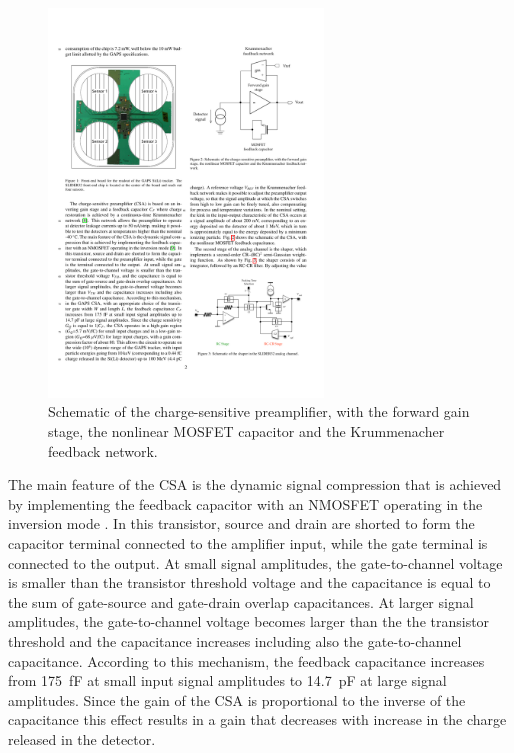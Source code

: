 \begin{figure}[h!]
    \centering
    \includegraphics[width=0.65\textwidth]{Images/chap1/CSA_schematic.pdf}
    \caption{Schematic of the charge-sensitive preamplifier, with the forward gain stage, the nonlinear MOSFET capacitor and the Krummenacher feedback network.}
    \label{figCSAschematic}
\end{figure}

\par
The main feature of the CSA is the dynamic signal compression that is achieved by implementing the feedback capacitor with an NMOSFET operating in the inversion mode \cite{manghisoni_2018_dynamic}. In this transistor, source and drain are shorted to form the capacitor terminal connected to the amplifier input, while the gate terminal is connected to the output. At small signal amplitudes, the gate-to-channel voltage is smaller than the transistor threshold voltage and the capacitance is equal to the sum of gate-source and gate-drain overlap capacitances. At larger signal amplitudes, the gate-to-channel voltage becomes larger than the the transistor threshold and the capacitance increases including also the gate-to-channel capacitance. According to this mechanism, the feedback capacitance increases from \SI{175}{\femto\farad} at small input signal amplitudes to \SI{14.7}{\pico\farad} at large signal amplitudes. Since the gain of the CSA is proportional to the inverse of the capacitance this effect results in a gain that decreases with increase in the charge released in the detector.

